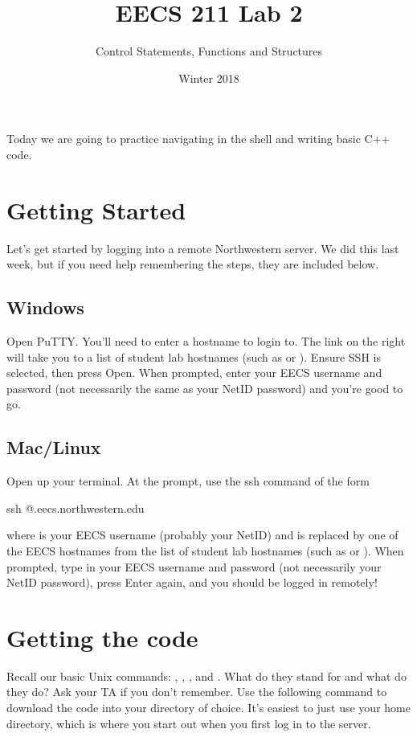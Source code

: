\documentclass{tufte-handout}
\title{EECS 211 Lab 2}
\author{Control Statements, Functions and Structures}
\date{Winter 2018}
\begin{document}
\maketitle

Today we are going to practice navigating in the shell and writing basic C++ code. 

\section{Getting Started}
Let's get started by logging into a remote Northwestern server. We did this last week, but if you need help remembering the steps, they are included below.

\subsection{Windows}
Open PuTTY. You'll need to enter a hostname to login to. The link on the right will take you to a list of student lab hostnames (such as   or ).  Ensure SSH is selected, then press Open. When prompted, enter your EECS username and password (not necessarily the same as your NetID password) and you're good to go.

\subsection{Mac/Linux}
Open up your terminal. At the prompt, use the ssh command of the form
\begin{CmdLine}
  \prompt ssh @.eecs.northwestern.edu
\end{CmdLine}
\noindent where  is your EECS username (probably your NetID)
and  is replaced by one of the EECS hostnames from the list
of student lab hostnames (such as  or
).
When prompted, type in your EECS username and password (not necessarily your NetID password), press
Enter again, and you should be logged in remotely!

\section{Getting the code}
Recall our basic Unix commands: , , , and . What do they stand for and what do they do? Ask your TA if you don't remember. 
Use the following  command to download the code into your directory of choice. It's easiest to just use your home directory, which is where you start out when you first log in to the server.
\end{document}
